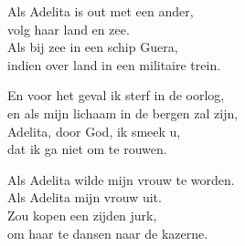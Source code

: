 \clearpage
\begin{translation}
Als Adelita is out met een ander,\\
volg haar land en zee.\\
Als bij zee in een schip Guera,\\
indien over land in een militaire trein.\vspace{\wlskip}

En voor het geval ik sterf in de oorlog,\\
en als mijn lichaam in de bergen zal zijn,\\
Adelita, door God, ik smeek u,\\
dat ik ga niet om te rouwen.\vspace{\wlskip}

Als Adelita wilde mijn vrouw te worden.\\
Als Adelita mijn vrouw uit.\\
Zou kopen een zijden jurk,\\
om haar te dansen naar de kazerne.
\end{translation}